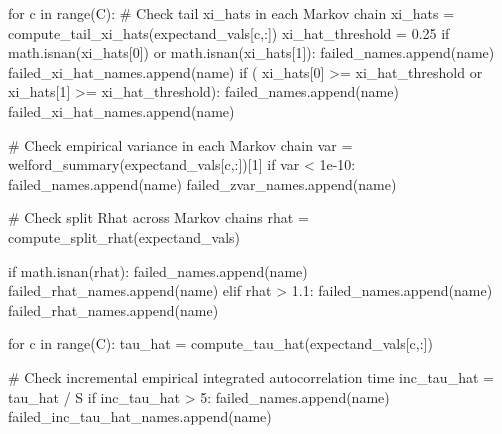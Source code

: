 \documentclass[
  letterpaper,
  DIV=11,
  numbers=noendperiod]{scrartcl}
\newenvironment{Shaded}{\begin{snugshade}}{\end{snugshade}}
\newcommand{\BuiltInTok}[1]{\textcolor[rgb]{0.00,0.23,0.31}{#1}}
\newcommand{\CommentTok}[1]{\textcolor[rgb]{0.37,0.37,0.37}{#1}}
\newcommand{\ControlFlowTok}[1]{\textcolor[rgb]{0.00,0.23,0.31}{#1}}
\newcommand{\DecValTok}[1]{\textcolor[rgb]{0.68,0.00,0.00}{#1}}
\newcommand{\FloatTok}[1]{\textcolor[rgb]{0.68,0.00,0.00}{#1}}
\newcommand{\KeywordTok}[1]{\textcolor[rgb]{0.00,0.23,0.31}{#1}}
\newcommand{\NormalTok}[1]{\textcolor[rgb]{0.00,0.23,0.31}{#1}}
\newcommand{\OperatorTok}[1]{\textcolor[rgb]{0.37,0.37,0.37}{#1}}
\begin{document}
\begin{Shaded}
\begin{Highlighting}[]
    \ControlFlowTok{for}\NormalTok{ c }\KeywordTok{in} \BuiltInTok{range}\NormalTok{(C):}
      \CommentTok{\# Check tail xi\_hats in each Markov chain}
\NormalTok{      xi\_hats }\OperatorTok{=}\NormalTok{ compute\_tail\_xi\_hats(expectand\_vals[c,:])}
\NormalTok{      xi\_hat\_threshold }\OperatorTok{=} \FloatTok{0.25}
      \ControlFlowTok{if}\NormalTok{ math.isnan(xi\_hats[}\DecValTok{0}\NormalTok{]) }\KeywordTok{or}\NormalTok{ math.isnan(xi\_hats[}\DecValTok{1}\NormalTok{]):}
\NormalTok{        failed\_names.append(name)}
\NormalTok{        failed\_xi\_hat\_names.append(name)}
      \ControlFlowTok{if}\NormalTok{ (   xi\_hats[}\DecValTok{0}\NormalTok{] }\OperatorTok{\textgreater{}=}\NormalTok{ xi\_hat\_threshold}
          \KeywordTok{or}\NormalTok{ xi\_hats[}\DecValTok{1}\NormalTok{] }\OperatorTok{\textgreater{}=}\NormalTok{ xi\_hat\_threshold):}
\NormalTok{        failed\_names.append(name)}
\NormalTok{        failed\_xi\_hat\_names.append(name)}

      \CommentTok{\# Check empirical variance in each Markov chain}
\NormalTok{      var }\OperatorTok{=}\NormalTok{ welford\_summary(expectand\_vals[c,:])[}\DecValTok{1}\NormalTok{]}
      \ControlFlowTok{if}\NormalTok{ var }\OperatorTok{\textless{}} \FloatTok{1e{-}10}\NormalTok{:}
\NormalTok{        failed\_names.append(name)}
\NormalTok{        failed\_zvar\_names.append(name)}

    \CommentTok{\# Check split Rhat across Markov chains}
\NormalTok{    rhat }\OperatorTok{=}\NormalTok{ compute\_split\_rhat(expectand\_vals)}

    \ControlFlowTok{if}\NormalTok{ math.isnan(rhat):}
\NormalTok{      failed\_names.append(name)}
\NormalTok{      failed\_rhat\_names.append(name)}
    \ControlFlowTok{elif}\NormalTok{ rhat }\OperatorTok{\textgreater{}} \FloatTok{1.1}\NormalTok{:}
\NormalTok{      failed\_names.append(name)}
\NormalTok{      failed\_rhat\_names.append(name)}

    \ControlFlowTok{for}\NormalTok{ c }\KeywordTok{in} \BuiltInTok{range}\NormalTok{(C):}
\NormalTok{      tau\_hat }\OperatorTok{=}\NormalTok{ compute\_tau\_hat(expectand\_vals[c,:])}

      \CommentTok{\# Check incremental empirical integrated autocorrelation time}
\NormalTok{      inc\_tau\_hat }\OperatorTok{=}\NormalTok{ tau\_hat }\OperatorTok{/}\NormalTok{ S}
      \ControlFlowTok{if}\NormalTok{ inc\_tau\_hat }\OperatorTok{\textgreater{}} \DecValTok{5}\NormalTok{:}
\NormalTok{        failed\_names.append(name)}
\NormalTok{        failed\_inc\_tau\_hat\_names.append(name)}


\end{Highlighting}
\end{Shaded}
\end{document}
